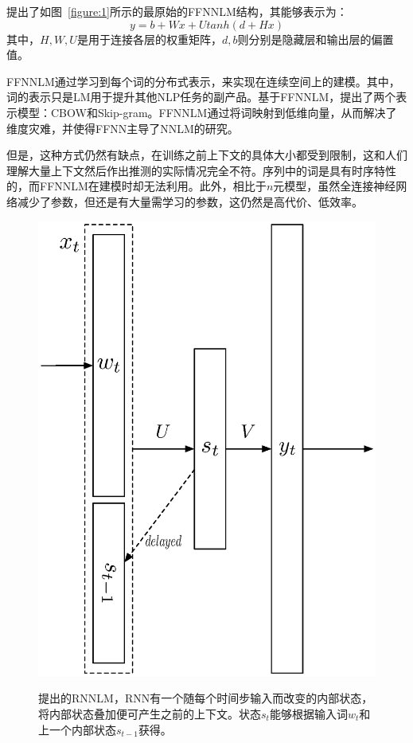 \documentclass[a4paper, 12pt, twocolumn]{article}
\newcommand{\figref}[1]{图~\ref{#1}}
\begin{document}
\cite{bengio2003quick}提出了如\figref{figure:1}所示的最原始的FFNNLM结构，其能够表示为：
\begin{equation}
  y=b+Wx+U tanh(d+Hx)
  \label{eq:4}
\end{equation}
其中，$H,W,U$是用于连接各层的权重矩阵，$d,b$则分别是隐藏层和输出层的偏置值。

FFNNLM通过学习到每个词的分布式表示，来实现在连续空间上的建模。其中，词的表示只是LM用于提升其他NLP任务的副产品。基于FFNNLM，\cite{mikolov2013efficient}提出了两个表示模型：CBOW和Skip-gram。FFNNLM通过将词映射到低维向量，从而解决了维度灾难，并使得FFNN主导了NNLM的研究。

但是，这种方式仍然有缺点，在训练之前上下文的具体大小都受到限制，这和人们理解大量上下文然后作出推测的实际情况完全不符。序列中的词是具有时序特性的，而FFNNLM在建模时却无法利用。此外，相比于$n$元模型，虽然全连接神经网络减少了参数，但还是有大量需学习的参数，这仍然是高代价、低效率。

\begin{figure}[!htp]
  \centering
  \includegraphics[width=.8\columnwidth]{figure-2.eps}
  \label{figure:2}
  \caption{\cite{mikolov2010recurrent,mikolov2011rnnlm}提出的RNNLM，RNN有一个随每个时间步输入而改变的内部状态，将内部状态叠加便可产生之前的上下文。状态$s_t$能够根据输入词$w_t$和上一个内部状态$s_{t-1}$获得。}
\end{figure}
\end{document}

